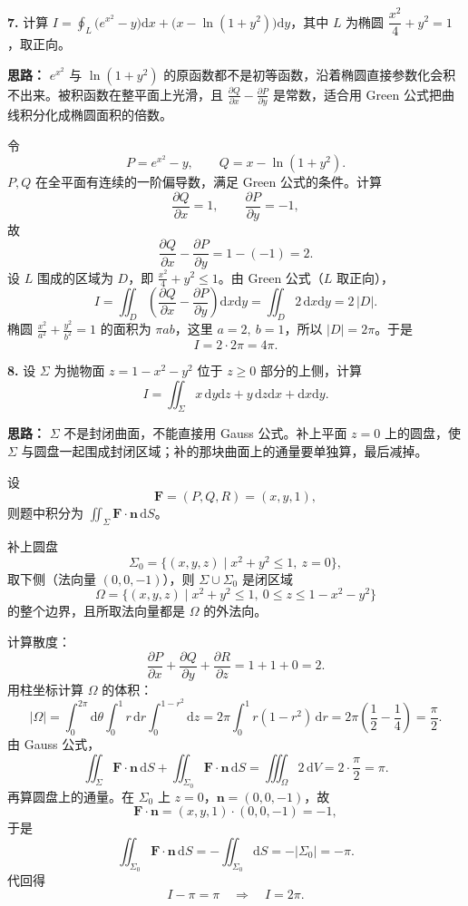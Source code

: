 \else \answerarea[10] \fi%

\textbf{7.} 计算 $\displaystyle I=\oint_L \bigl(e^{x^2}-y\bigr)\mathrm{d}x+\bigl(x-\ln(1+y^2)\bigr)\mathrm{d}y$，其中 $L$ 为椭圆 $\dfrac{x^2}{4}+y^2=1$，取正向。

\ifshowsolutions%
\textbf{思路：} $e^{x^2}$ 与 $\ln(1+y^2)$ 的原函数都不是初等函数，沿着椭圆直接参数化会积不出来。被积函数在整平面上光滑，且 $\frac{\partial Q}{\partial x}-\frac{\partial P}{\partial y}$ 是常数，适合用 Green 公式把曲线积分化成椭圆面积的倍数。

令
\[
P=e^{x^2}-y,\qquad Q=x-\ln(1+y^2).
\]
$P,Q$ 在全平面有连续的一阶偏导数，满足 Green 公式的条件。计算
\[
\frac{\partial Q}{\partial x}=1,\qquad
\frac{\partial P}{\partial y}=-1,
\]
故
\[
\frac{\partial Q}{\partial x}-\frac{\partial P}{\partial y}=1-(-1)=2.
\]
设 $L$ 围成的区域为 $D$，即 $\frac{x^2}{4}+y^2\le1$。由 Green 公式（$L$ 取正向），
\[
I=\iint_D\left(\frac{\partial Q}{\partial x}-\frac{\partial P}{\partial y}\right)\mathrm{d}x\mathrm{d}y
=\iint_D 2\,\mathrm{d}x\mathrm{d}y
=2\,|D|.
\]
椭圆 $\frac{x^2}{a^2}+\frac{y^2}{b^2}=1$ 的面积为 $\pi ab$，这里 $a=2,\ b=1$，所以 $|D|=2\pi$。于是
\[
I=2\cdot 2\pi=4\pi.
\]

\else \answerarea[8] \fi%

\textbf{8.} 设 $\Sigma$ 为抛物面 $z=1-x^2-y^2$ 位于 $z\ge0$ 部分的上侧，计算
\[
I=\iint_\Sigma x\,\mathrm{d}y\mathrm{d}z+y\,\mathrm{d}z\mathrm{d}x+\mathrm{d}x\mathrm{d}y.
\]

\ifshowsolutions%
\textbf{思路：} $\Sigma$ 不是封闭曲面，不能直接用 Gauss 公式。补上平面 $z=0$ 上的圆盘，使 $\Sigma$ 与圆盘一起围成封闭区域；补的那块曲面上的通量要单独算，最后减掉。

设
\[
\mathbf F=(P,Q,R)=(x,y,1),
\]
则题中积分为 $\iint_\Sigma \mathbf F\cdot\mathbf n\,\mathrm{d}S$。

补上圆盘
\[
\Sigma_0=\{(x,y,z)\mid x^2+y^2\le1,\ z=0\},
\]
取下侧（法向量 $(0,0,-1)$），则 $\Sigma\cup\Sigma_0$ 是闭区域
\[
\Omega=\{(x,y,z)\mid x^2+y^2\le1,\ 0\le z\le1-x^2-y^2\}
\]
的整个边界，且所取法向量都是 $\Omega$ 的外法向。

计算散度：
\[
\frac{\partial P}{\partial x}+\frac{\partial Q}{\partial y}+\frac{\partial R}{\partial z}
=1+1+0=2.
\]
用柱坐标计算 $\Omega$ 的体积：
\[
|\Omega|=\int_0^{2\pi}\!\!\mathrm{d}\theta\int_0^1 r\,\mathrm{d}r\int_0^{1-r^2}\mathrm{d}z
=2\pi\int_0^1 r(1-r^2)\,\mathrm{d}r
=2\pi\left(\frac12-\frac14\right)=\frac{\pi}{2}.
\]
由 Gauss 公式，
\[
\iint_\Sigma \mathbf F\cdot\mathbf n\,\mathrm{d}S
+\iint_{\Sigma_0}\mathbf F\cdot\mathbf n\,\mathrm{d}S
=\iiint_\Omega 2\,\mathrm{d}V
=2\cdot\frac{\pi}{2}=\pi.
\]
再算圆盘上的通量。在 $\Sigma_0$ 上 $z=0$，$\mathbf n=(0,0,-1)$，故
\[
\mathbf F\cdot\mathbf n=(x,y,1)\cdot(0,0,-1)=-1,
\]
于是
\[
\iint_{\Sigma_0}\mathbf F\cdot\mathbf n\,\mathrm{d}S
=-\iint_{\Sigma_0}\mathrm{d}S
=-|\Sigma_0|
=-\pi.
\]
代回得
\[
I-\pi=\pi\quad\Longrightarrow\quad I=2\pi.
\]

